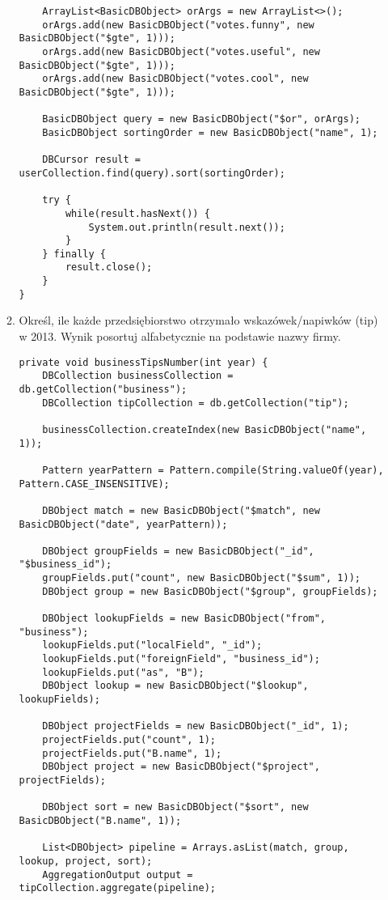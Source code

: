 \documentclass[a4paper,9pt]{extarticle}	%
\begin{document}
\begin{enumerate}
\begin{enumerate}
\begin{lstlisting}
	ArrayList<BasicDBObject> orArgs = new ArrayList<>();
	orArgs.add(new BasicDBObject("votes.funny", new BasicDBObject("$gte", 1)));
	orArgs.add(new BasicDBObject("votes.useful", new BasicDBObject("$gte", 1)));
	orArgs.add(new BasicDBObject("votes.cool", new BasicDBObject("$gte", 1)));

	BasicDBObject query = new BasicDBObject("$or", orArgs);
	BasicDBObject sortingOrder = new BasicDBObject("name", 1);

	DBCursor result = userCollection.find(query).sort(sortingOrder);

	try {
		while(result.hasNext()) {
			System.out.println(result.next());
		}
	} finally {
		result.close();
	}
}
	  \end{lstlisting}
	  
	  \item Określ, ile każde przedsiębiorstwo otrzymało wskazówek/napiwków (tip) w 2013. Wynik posortuj alfabetycznie na podstawie nazwy firmy.
	  \begin{lstlisting}
private void businessTipsNumber(int year) {
	DBCollection businessCollection = db.getCollection("business");
	DBCollection tipCollection = db.getCollection("tip");

	businessCollection.createIndex(new BasicDBObject("name", 1));

	Pattern yearPattern = Pattern.compile(String.valueOf(year), Pattern.CASE_INSENSITIVE);

	DBObject match = new BasicDBObject("$match", new BasicDBObject("date", yearPattern));

	DBObject groupFields = new BasicDBObject("_id", "$business_id");
	groupFields.put("count", new BasicDBObject("$sum", 1));
	DBObject group = new BasicDBObject("$group", groupFields);

	DBObject lookupFields = new BasicDBObject("from", "business");
	lookupFields.put("localField", "_id");
	lookupFields.put("foreignField", "business_id");
	lookupFields.put("as", "B");
	DBObject lookup = new BasicDBObject("$lookup", lookupFields);

	DBObject projectFields = new BasicDBObject("_id", 1);
	projectFields.put("count", 1);
	projectFields.put("B.name", 1);
	DBObject project = new BasicDBObject("$project", projectFields);

	DBObject sort = new BasicDBObject("$sort", new BasicDBObject("B.name", 1));

	List<DBObject> pipeline = Arrays.asList(match, group, lookup, project, sort);
	AggregationOutput output = tipCollection.aggregate(pipeline);


\end{lstlisting}
\end{enumerate}
\end{enumerate}
\end{document}
